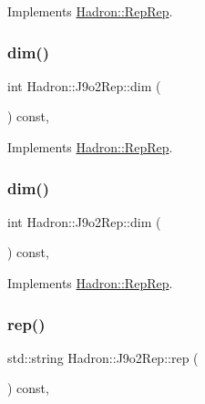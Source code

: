Implements \mbox{\hyperlink{structHadron_1_1RepRep_a92c8802e5ed7afd7da43ccfd5b7cd92b}{Hadron\+::\+Rep\+Rep}}.

\mbox{\label{structHadron_1_1J9o2Rep_a66921d681b6217d1ef68bc63ad21cd15}} 
\subsubsection{\texorpdfstring{dim()}{dim()}\hspace{0.1cm}{\footnotesize\ttfamily [2/3]}}
{\footnotesize\ttfamily int Hadron\+::\+J9o2\+Rep\+::dim (\begin{DoxyParamCaption}{ }\end{DoxyParamCaption}) const\hspace{0.3cm}{\ttfamily [inline]}, {\ttfamily [virtual]}}



Implements \mbox{\hyperlink{structHadron_1_1RepRep_a92c8802e5ed7afd7da43ccfd5b7cd92b}{Hadron\+::\+Rep\+Rep}}.

\mbox{\label{structHadron_1_1J9o2Rep_a66921d681b6217d1ef68bc63ad21cd15}} 
\subsubsection{\texorpdfstring{dim()}{dim()}\hspace{0.1cm}{\footnotesize\ttfamily [3/3]}}
{\footnotesize\ttfamily int Hadron\+::\+J9o2\+Rep\+::dim (\begin{DoxyParamCaption}{ }\end{DoxyParamCaption}) const\hspace{0.3cm}{\ttfamily [inline]}, {\ttfamily [virtual]}}



Implements \mbox{\hyperlink{structHadron_1_1RepRep_a92c8802e5ed7afd7da43ccfd5b7cd92b}{Hadron\+::\+Rep\+Rep}}.

\mbox{\label{structHadron_1_1J9o2Rep_ad83e9b0b6221fcaeeeed5f2653890334}} 
\subsubsection{\texorpdfstring{rep()}{rep()}\hspace{0.1cm}{\footnotesize\ttfamily [1/3]}}
{\footnotesize\ttfamily std\+::string Hadron\+::\+J9o2\+Rep\+::rep (\begin{DoxyParamCaption}{ }\end{DoxyParamCaption}) const\hspace{0.3cm}{\ttfamily [inline]}, {\ttfamily [virtual]}}



